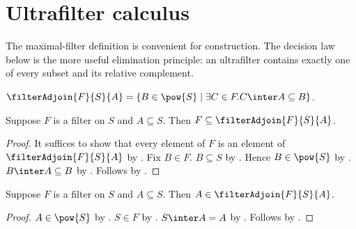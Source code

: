 \section{Ultrafilter calculus}






The maximal-filter definition is convenient for construction.  The decision
law below is the more useful elimination principle: an ultrafilter contains
exactly one of every subset and its relative complement.

\begin{definition}\label{filter_adjoin}
    $\filterAdjoin{F}{S}{A}=
        \{B\in\pow{S}\mid
            \exists C\in F. C\inter A\subseteq B\}$.
\end{definition}

\begin{proposition}\label{filter_adjoin_contains_filter}
    Suppose $F$ is a filter on $S$ and $A\subseteq S$.
    Then $F\subseteq\filterAdjoin{F}{S}{A}$.
\end{proposition}
\begin{proof}
    It suffices to show that every element of $F$ is an element of
        $\filterAdjoin{F}{S}{A}$ by .
    Fix $B\in F$.
    $B\subseteq S$ by .
    Hence $B\in\pow{S}$ by .
    $B\inter A\subseteq B$ by .
    Follows by .
\end{proof}

\begin{proposition}\label{filter_adjoin_contains_set}
    Suppose $F$ is a filter on $S$ and $A\subseteq S$.
    Then $A\in\filterAdjoin{F}{S}{A}$.
\end{proposition}
\begin{proof}
    $A\in\pow{S}$ by .
    $S\in F$ by .
    $S\inter A=A$ by .
    Follows by .
\end{proof}

